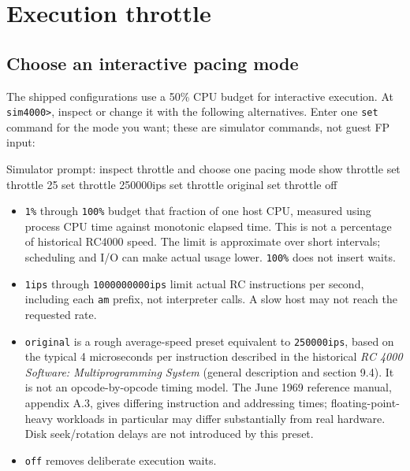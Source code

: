 \chapter{Execution throttle}\label{execution-throttle}

\section{Choose an interactive pacing mode}\label{choose-an-interactive-pacing-mode}

The shipped configurations use a 50\% CPU budget for interactive execution. At \passthrough{\lstinline!sim4000>!}, inspect or change it with the following alternatives. Enter one \passthrough{\lstinline!set!} command for the mode you want; these are simulator commands, not guest FP input:

\begin{commandexample}{Simulator prompt: inspect throttle and choose one pacing mode}
show throttle
set throttle 25%
set throttle 250000ips
set throttle original
set throttle off
\end{commandexample}

\begin{itemize}
\tightlist
\item
  \passthrough{\lstinline!1\%!} through \passthrough{\lstinline!100\%!} budget that fraction of one host CPU, measured using process CPU time against monotonic elapsed time. This is not a percentage of historical RC4000 speed. The limit is approximate over short intervals; scheduling and I/O can make actual usage lower. \passthrough{\lstinline!100\%!} does not insert waits.
\item
  \passthrough{\lstinline!1ips!} through \passthrough{\lstinline!1000000000ips!} limit actual RC instructions per second, including each \passthrough{\lstinline!am!} prefix, not interpreter calls. A slow host may not reach the requested rate.
\item
  \passthrough{\lstinline!original!} is a rough average-speed preset equivalent to \passthrough{\lstinline!250000ips!}, based on the typical 4 microseconds per instruction described in the historical \emph{RC 4000 Software: Multiprogramming System} (general description and section 9.4). It is not an opcode-by-opcode timing model. The June 1969 reference manual, appendix A.3, gives differing instruction and addressing times; floating-point-heavy workloads in particular may differ substantially from real hardware. Disk seek/rotation delays are not introduced by this preset.
\item
  \passthrough{\lstinline!off!} removes deliberate execution waits.
\end{itemize}

